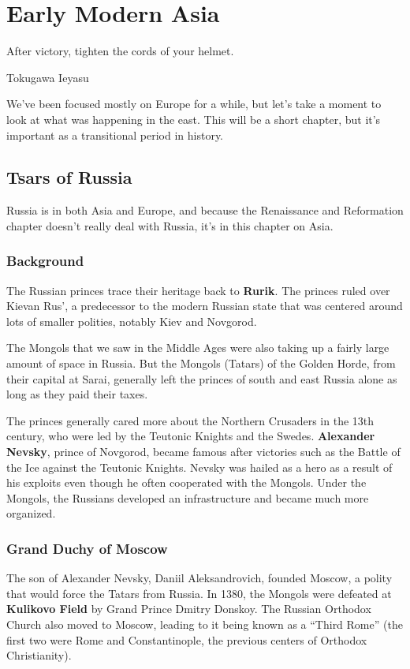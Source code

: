 \chapter{Early Modern Asia}

\epigraph{%
  After victory, tighten the cords of your helmet.
}{Tokugawa Ieyasu}

We've been focused mostly on Europe for a while,
but let's take a moment to look at what was happening in the east.
This will be a short chapter, but it's important as a transitional period in history.

\section{Tsars of Russia}

Russia is in both Asia and Europe,
and because the Renaissance and Reformation chapter doesn't really deal with Russia,
it's in this chapter on Asia.

\subsection*{Background}

The Russian princes trace their heritage back to \textbf{Rurik}.
The princes ruled over Kievan Rus',
a predecessor to the modern Russian state that was centered around lots of smaller polities,
notably Kiev and Novgorod.

The Mongols that we saw in the Middle Ages were also taking up a fairly large amount of space in Russia.
But the Mongols (Tatars) of the Golden Horde, from their capital at Sarai,
generally left the princes of south and east Russia alone as long as they paid their taxes.

The princes generally cared more about the Northern Crusaders in the 13th century,
who were led by the Teutonic Knights and the Swedes.
\textbf{Alexander Nevsky}, prince of Novgorod,
became famous after victories such as the Battle of the Ice against the Teutonic Knights.
Nevsky was hailed as a hero as a result of his exploits even though he often cooperated with the Mongols.
Under the Mongols, the Russians developed an infrastructure and became much more organized.

\subsection*{Grand Duchy of Moscow}

The son of Alexander Nevsky, Daniil Aleksandrovich, founded Moscow,
a polity that would force the Tatars from Russia.
In 1380, the Mongols were defeated at \textbf{Kulikovo Field} by Grand Prince Dmitry Donskoy.
The Russian Orthodox Church also moved to Moscow, leading to it being known as a ``Third Rome''
(the first two were Rome and Constantinople, the previous centers of Orthodox Christianity).

